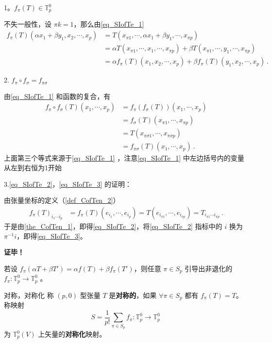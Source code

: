 1。$f_\pi(T)\in\mathbb{T}_p^0$

不失一般性，设 $\pi k=1$，那么由\autoref{eq_SIofTe_1} 
\begin{equation}
\begin{aligned}
f_\pi(T)(\alpha x_1+\beta y_1,x_2,\cdots,x_p)&=T(x_{\pi1},\cdots,\alpha x_1+\beta y_1,\cdots,x_{\pi p})\\
&=\alpha T(x_{\pi1},\cdots,x_1,\cdots,x_{\pi p})+\beta T(x_{\pi1},\cdots,y_1,\cdots,x_{\pi p})\\
&=\alpha f_{\pi}(T)(x_1,x_2,\cdots,x_p)+\beta f_{\pi}(T)(y_1,x_2,\cdots,x_p)~.
\end{aligned}
\end{equation}

2. $f_\pi \circ f_\sigma=f_{\pi\sigma}$

由\autoref{eq_SIofTe_1} 和函数的复合，有
\begin{equation}
\begin{aligned}
f_\pi\circ f_\sigma(T)(x_1,\cdots,x_p)&=f_\pi(f_\sigma(T))(x_{1},\cdots,x_{p})\\
&=f_\sigma(T)(x_{\pi1},\cdots,x_{\pi p})\\
&=T(x_{\pi\sigma1},\cdots,x_{\pi\sigma p})\\
&=f_{\pi\sigma}(T)(x_1,\cdots,x_p)~.
\end{aligned}
\end{equation}
上面第三个等式来源于\autoref{eq_SIofTe_1} ，注意\autoref{eq_SIofTe_1} 中左边括号内的变量从左到右恒为1开始

3.\autoref{eq_SIofTe_2}，\autoref{eq_SIofTe_3} 的证明：

由张量坐标的定义（\autoref{def_CofTen_2}）
\begin{equation}
\begin{aligned}
f_{\pi}(T)_{i_1\cdots i_p}&=f_{\pi}(T)(e_{i_1},\cdots,e_{i_p})=T(e_{i_{\pi1}},\cdots,e_{i_{\pi p}})=T_{i_{\pi1}\cdots i_{\pi p}}~.
\end{aligned}
\end{equation}
于是由\autoref{the_CofTen_1}，即得\autoref{eq_SIofTe_2}，将\autoref{eq_SIofTe_2} 指标中的 $i$ 换为  $\pi^{-1} i$，即得\autoref{eq_SIofTe_3}。

\textbf{证毕！}

若设 $f_\pi(\alpha T+\beta T')=\alpha f(T)+\beta f_\pi(T')$，则任意 $\pi \in S_p$ 引导出非退化的 $f_\pi:\mathbb{T}_p^0\rightarrow\mathbb{T}_p^0$ 。

\begin{definition}{对称，对称化}
称 $(p,0)$ 型张量 $T$ 是\textbf{对称的}，如果 $\forall \pi\in S_p$ 都有 $f_{\pi}(T)=T$。称映射 
\begin{equation}
S=\frac{1}{p!}\sum_{\pi\in S_p} f_\pi:\mathbb{T}_p^0\rightarrow\mathbb{T}_p^0~
\end{equation}
为 $\mathbb{T}_p^0(V)$ 上矢量的\textbf{对称化}映射。
\end{definition}

